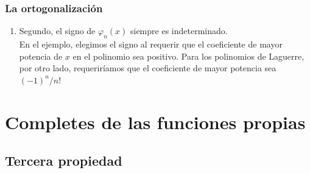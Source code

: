 \documentclass[12pt]{beamer}
\begin{document}
\begin{frame}
\frametitle{La ortogonalización}
\begin{enumerate}[<+->]
\conti
\item Segundo, el signo de $\varphi_{n} (x)$ siempre es indeterminado.
\\
En el ejemplo, elegimos el signo al requerir que el coeficiente de mayor potencia de $x$ en el polinomio sea positivo. Para los polinomios de Laguerre, por otro lado, requeriríamos que el coeficiente de mayor potencia sea $(-1)^{n}/n!$
\end{enumerate}
\end{frame}

\section{Completes de las funciones propias}
\subsection{Tercera propiedad}
\end{document}
